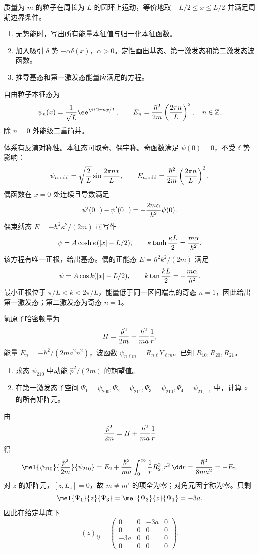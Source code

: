 
\begin{question}
质量为 $m$ 的粒子在周长为 $L$ 的圆环上运动，等价地取 $-L/2\le x\le L/2$ 并满足周期边界条件。
\begin{enumerate}
  \item 无势能时，写出所有能量本征值与归一化本征函数。
  \item 加入吸引 $\delta$ 势 $-\alpha\delta(x)$，$\alpha>0$。定性画出基态、第一激发态和第二激发态波函数。
  \item 推导基态和第一激发态能量应满足的方程。
\end{enumerate}
\begin{solution}
自由粒子本征态为
\[
  \psi_n(x)={1\over\sqrt L}\ee^{\ii 2\pi n x/L},\qquad
  E_n={\hbar^2\over2m}\left({2\pi n\over L}\right)^2,\quad n\in\mathbb Z .
\]
除 $n=0$ 外能级二重简并。

体系有反演对称性。本征态可取奇、偶宇称。奇函数满足 $\psi(0)=0$，不受 $\delta$ 势影响：
\[
  \psi_{n,\mathrm{odd}}=\sqrt{2\over L}\sin {2\pi n x\over L},
  \qquad E_{n,\mathrm{odd}}={\hbar^2\over2m}\left({2\pi n\over L}\right)^2 .
\]
偶函数在 $x=0$ 处连续且导数满足
\[
  \psi'(0^+)-\psi'(0^-)=-{2m\alpha\over\hbar^2}\psi(0) .
\]
偶束缚态 $E=-\hbar^2\kappa^2/(2m)$ 可写作
\[
  \psi=A\cosh\kappa(|x|-L/2),
  \qquad \kappa\tanh{\kappa L\over2}={m\alpha\over\hbar^2}.
\]
该方程有唯一正根，给出基态。偶的正能态 $E=\hbar^2k^2/(2m)$ 满足
\[
  \psi=A\cos k(|x|-L/2),
  \qquad k\tan{kL\over2}=-{m\alpha\over\hbar^2}.
\]
最小正根位于 $\pi/L<k<2\pi/L$，能量低于同一区间端点的奇态
$n=1$，因此给出第一激发态；第二激发态为奇态 $n=1$。
\end{solution}
\end{question}

\begin{question}
氢原子哈密顿量为
\[
  H={\hat p^2\over2m}-{\hbar^2\over ma}{1\over r},
\]
能量 $E_n=-\hbar^2/(2ma^2n^2)$，波函数 $\psi_{n\ell m}=R_{n\ell}Y_{\ell m}$。已知 $R_{10},R_{20},R_{21}$。
\begin{enumerate}
  \item 求态 $\psi_{210}$ 中动能 $\hat p^2/(2m)$ 的期望值。
  \item 在第一激发态子空间 $\Psi_1=\psi_{200},\Psi_2=\psi_{211},\Psi_3=\psi_{210},\Psi_4=\psi_{21,-1}$ 中，计算 $z$ 的所有矩阵元。
\end{enumerate}
\begin{solution}
由
\[
  {\hat p^2\over2m}=H+{\hbar^2\over ma}{1\over r}
\]
得
\[
  \mel{\psi_{210}}{{\hat p^2\over2m}}{\psi_{210}}
  =E_2+{\hbar^2\over ma}\int_0^\infty {1\over r}R_{21}^2r^2\,\dd r
  ={\hbar^2\over8ma^2}=-E_2 .
\]
对 $z$ 的矩阵元，$[z,L_z]=0$，故 $m\ne m'$ 的项全为零；对角元因宇称为零。只剩
\[
  \mel{\Psi_1}{z}{\Psi_3}=\mel{\Psi_3}{z}{\Psi_1}=-3a .
\]
因此在给定基底下
\[
  (z)_{ij}=
  \begin{pmatrix}
  0&0&-3a&0\\
  0&0&0&0\\
  -3a&0&0&0\\
  0&0&0&0
  \end{pmatrix}.
\]
\end{solution}
\end{question}

